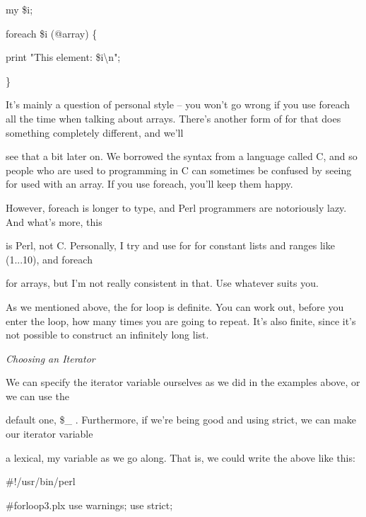 \documentclass[a4paper,11pt]{book}
\begin{document}
\noindent my \$i;

\noindent foreach \$i (@array) \{

\noindent print "This element: \$i\textbackslash n";

\noindent \}

\noindent 

\noindent It's mainly a question of personal style -- you won't go wrong if you use foreach all the time when talking about arrays. There's another form of for that does something completely different, and we'll

\noindent see that a bit later on. We borrowed the syntax from a language called C, and so people who are used to programming in C can sometimes be confused by seeing for used with an array. If you use foreach, you'll keep them happy.

\noindent 

\noindent 

\noindent However, foreach is longer to type, and Perl programmers are notoriously lazy. And what's more, this

\noindent is Perl, not C. Personally, I try and use for for constant lists and ranges like (1...10), and foreach

\noindent for arrays, but I'm not really consistent in that. Use whatever suits you.

\noindent 

\noindent As we mentioned above, the for loop is definite. You can work out, before you enter the loop, how many times you are going to repeat. It's also finite, since it's not possible to construct an infinitely long list.

\noindent 

\noindent \textit{Choosing an Iterator}

\noindent We can specify the iterator variable ourselves as we did in the examples above, or we can use the

\noindent default one, \$\_ . Furthermore, if we're being good and using strict, we can make our iterator variable

\noindent a lexical, my variable as we go along. That is, we could write the above like this:

\noindent 

\noindent 

\noindent \#!/usr/bin/perl

\noindent \#forloop3.plx use warnings; use strict;

\noindent 
\end{document}
